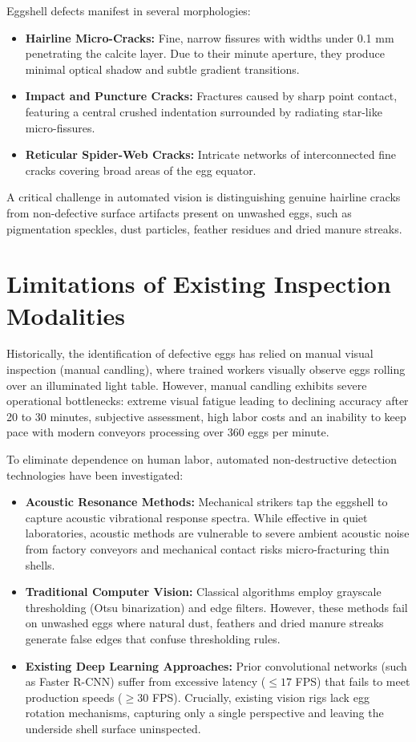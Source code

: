 \documentclass[12pt,a4paper]{report}
\begin{document}
Eggshell defects manifest in several morphologies:
\begin{itemize}
    \item \textbf{Hairline Micro-Cracks:} Fine, narrow fissures with widths under 0.1 mm penetrating the calcite layer. Due to their minute aperture, they produce minimal optical shadow and subtle gradient transitions.
    \item \textbf{Impact and Puncture Cracks:} Fractures caused by sharp point contact, featuring a central crushed indentation surrounded by radiating star-like micro-fissures.
    \item \textbf{Reticular Spider-Web Cracks:} Intricate networks of interconnected fine cracks covering broad areas of the egg equator.
\end{itemize}

A critical challenge in automated vision is distinguishing genuine hairline cracks from non-defective surface artifacts present on unwashed eggs, such as pigmentation speckles, dust particles, feather residues and dried manure streaks.

\section{Limitations of Existing Inspection Modalities}

Historically, the identification of defective eggs has relied on manual visual inspection (manual candling), where trained workers visually observe eggs rolling over an illuminated light table. However, manual candling exhibits severe operational bottlenecks: extreme visual fatigue leading to declining accuracy after 20 to 30 minutes, subjective assessment, high labor costs and an inability to keep pace with modern conveyors processing over 360 eggs per minute.

To eliminate dependence on human labor, automated non-destructive detection technologies have been investigated:
\begin{itemize}
    \item \textbf{Acoustic Resonance Methods:} Mechanical strikers tap the eggshell to capture acoustic vibrational response spectra. While effective in quiet laboratories, acoustic methods are vulnerable to severe ambient acoustic noise from factory conveyors and mechanical contact risks micro-fracturing thin shells.
    \item \textbf{Traditional Computer Vision:} Classical algorithms employ grayscale thresholding (Otsu binarization) and edge filters. However, these methods fail on unwashed eggs where natural dust, feathers and dried manure streaks generate false edges that confuse thresholding rules.
    \item \textbf{Existing Deep Learning Approaches:} Prior convolutional networks (such as Faster R-CNN) suffer from excessive latency ($\le 17$ FPS) that fails to meet production speeds ($\ge 30$ FPS). Crucially, existing vision rigs lack egg rotation mechanisms, capturing only a single perspective and leaving the underside shell surface uninspected.
\end{itemize}
\end{document}
